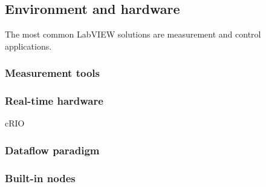\subsection{Environment and hardware}

The most common LabVIEW solutions are measurement and control applications.
\subsubsection{Measurement tools}
\subsubsection{Real-time hardware}
cRIO

\subsubsection{Dataflow paradigm}
\subsubsection{Built-in nodes}
